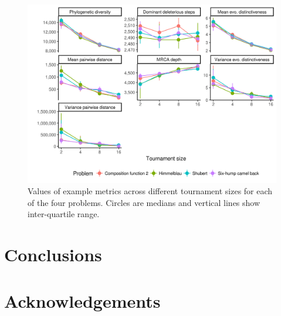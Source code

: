 \documentclass[letterpaper]{article}
\begin{document}
\begin{figure}
\includegraphics[width=7in]{figs/all_ts.png}
\caption{Values of example metrics across different tournament sizes for each of the four problems. Circles are medians and vertical lines show inter-quartile range.}
\end{figure}


\section{Conclusions}

\section{Acknowledgements}


\footnotesize

\end{document}
